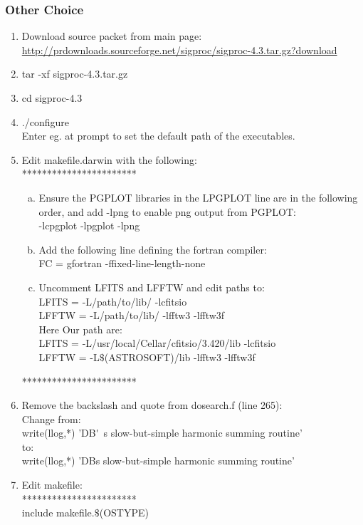 \documentclass{article}
\begin{document}
\subsubsection{Other Choice}
\begin{enumerate}[1):]
\item  Download source packet from main page:\\
 \url{http://prdownloads.sourceforge.net/sigproc/sigproc-4.3.tar.gz?download}
 \item tar -xf sigproc-4.3.tar.gz
 \item cd sigproc-4.3
 \item ./configure \\
 Enter eg. at prompt to set the default path of the executables.
 \item Edit makefile.darwin with the following:\\
 
   ***********************
 	\begin{enumerate}[a)]
 	\item 	Ensure the PGPLOT libraries in the LPGPLOT line are in the following order, and add -lpng to enable png output from PGPLOT: \\
 	-lcpgplot -lpgplot -lpng
 	\item  Add the following line defining the fortran compiler: \\
 	FC = gfortran -ffixed-line-length-none
 	\item Uncomment LFITS and LFFTW and edit paths to: \\
 	
 	LFITS = -L/path/to/lib/ -lcfitsio  \\ 
 	LFFTW = -L/path/to/lib/ -lfftw3 -lfftw3f \\
 	
 	Here Our path are:\\
 	
 	LFITS = -L/usr/local/Cellar/cfitsio/3.420/lib -lcfitsio\\ 
    LFFTW = -L$\$$(ASTROSOFT)/lib -lfftw3 -lfftw3f

 	\end{enumerate}
 	***********************\\    
\item Remove the backslash and quote from dosearch.f (line 265):\\
	Change from:\\
	write(llog,*) 'DB\'~s slow-but-simple harmonic summing routine' \\
	to:\\
	write(llog,*) 'DBs slow-but-simple harmonic summing routine'
\item Edit makefile:\\
***********************\\
	include makefile.$\$$(OSTYPE) \\


\end{enumerate}
\end{document}
